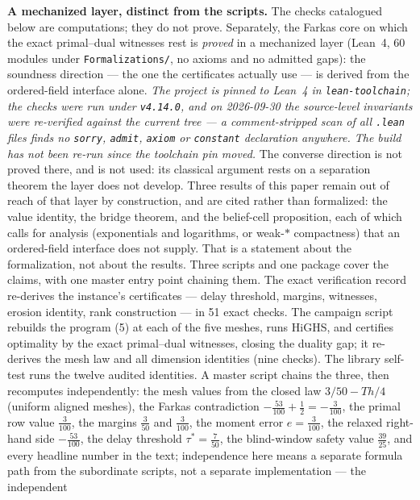 \documentclass[10pt,twocolumn]{article}
\theoremstyle{plain}
\theoremstyle{definition}
\theoremstyle{remark}
\begin{document}
\noindent\textbf{A mechanized layer, distinct from the scripts.} The
checks catalogued below are computations; they do not prove. Separately,
the Farkas core on which the exact primal--dual witnesses rest is
\emph{proved} in a mechanized layer (Lean~4, 60 modules under \texttt{Formalizations/}, no axioms and no admitted gaps): the soundness direction --- the one the certificates actually use --- is derived from the ordered-field interface alone.
\emph{The project is pinned to Lean~4 in \texttt{lean-toolchain}; the checks were run under
\texttt{v4.14.0}, and on 2026-09-30 the source-level invariants were re-verified against the
current tree --- a comment-stripped scan of all \texttt{.lean} files finds no \texttt{sorry},
\texttt{admit}, \texttt{axiom} or \texttt{constant} declaration anywhere. The build has not
been re-run since the toolchain pin moved.} The converse direction is not proved there, and is not
used: its classical argument rests on a separation theorem the layer
does not develop. Three results of this paper remain out of reach of
that layer by construction, and are cited rather than formalized: the
value identity, the bridge theorem, and the belief-cell proposition,
each of which calls for analysis (exponentials and logarithms, or
weak-\(*\) compactness) that an ordered-field interface does not
supply. That is a statement about the formalization, not about the
results.
Three scripts and one package cover the claims, with one master entry
point chaining them. The exact
verification record re-derives the instance's certificates --- delay
threshold, margins, witnesses, erosion identity, rank construction ---
in 51 exact checks. The campaign script rebuilds the program (5) at each of
the five meshes, runs HiGHS, and certifies optimality by the exact
primal--dual witnesses, closing the duality gap; it re-derives the mesh law
and all dimension identities (nine checks). The library self-test runs the
twelve audited identities. A master script chains the three, then
recomputes independently: the mesh values from the closed law
\(3/50 - Th/4\) (uniform aligned meshes), the Farkas contradiction
\(-\tfrac{53}{100} + \tfrac12 = -\tfrac{3}{100}\), the primal row value
\(\tfrac{3}{100}\), the margins \(\tfrac{3}{50}\) and \(\tfrac{3}{100}\),
the moment error \(e = \tfrac{3}{100}\), the relaxed right-hand side
\(-\tfrac{53}{100}\), the delay threshold \(\tau^{*} = \tfrac{7}{50}\), the blind-window safety value \(\tfrac{39}{25}\), and every headline
number in the text; independence here means a separate formula path from
the subordinate scripts, not a separate implementation --- the independent
\end{document}
